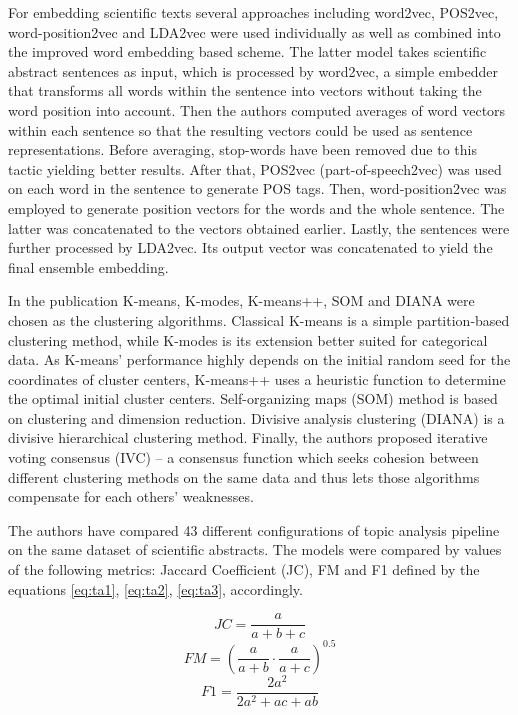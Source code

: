 \documentclass[13pt, a4paper]{article}
\begin{document}
For embedding scientific texts several approaches including word2vec, POS2vec, word-position2vec and LDA2vec were used individually as well as combined into the improved word embedding based scheme. The latter model takes scientific abstract sentences as input, which is processed by word2vec, a simple embedder that transforms all words within the sentence into vectors without taking the word position into account. Then the authors computed averages of word vectors within each sentence so that the resulting vectors could be used as sentence representations. Before averaging, stop-words have been removed due to this tactic yielding better results. After that, POS2vec (part-of-speech2vec) was used on each word in the sentence to generate POS tags. Then, word-position2vec was employed to generate position vectors for the words and the whole sentence. The latter was concatenated to the vectors obtained earlier. Lastly, the sentences were further processed by LDA2vec. Its output vector was concatenated to yield the final ensemble embedding.

In the publication K-means, K-modes, K-means++, SOM and DIANA were chosen as the clustering algorithms. Classical K-means is a simple partition-based clustering method, while K-modes is its extension better suited for categorical data. As K-means' performance highly depends on the initial random seed for the coordinates of cluster centers, K-means++ uses a heuristic function to determine the optimal initial cluster centers. Self-organizing maps (SOM) method is based on clustering and dimension reduction. Divisive analysis clustering (DIANA) is a divisive hierarchical clustering method. Finally, the authors proposed iterative voting consensus (IVC) -- a consensus function which seeks cohesion between different clustering methods on the same data and thus lets those algorithms compensate for each others' weaknesses.

The authors have compared 43 different configurations of topic analysis pipeline on the same dataset of scientific abstracts. The models were compared by values of the following metrics: Jaccard Coefficient (JC), FM and F1 defined by the equations \ref{eq:ta1}, \ref{eq:ta2}, \ref{eq:ta3}, accordingly.

\begin{equation} \label{eq:ta1}
JC = \frac{a}{a+b+c}
\end{equation}
\begin{equation} \label{eq:ta2}
FM = \left( \frac{a}{a+b} \cdot \frac{a}{a+c} \right)^{0.5}
\end{equation}
\begin{equation} \label{eq:ta3}
F1 = \frac{2a^2}{2a^2 + ac + ab}
\end{equation}
\end{document}
